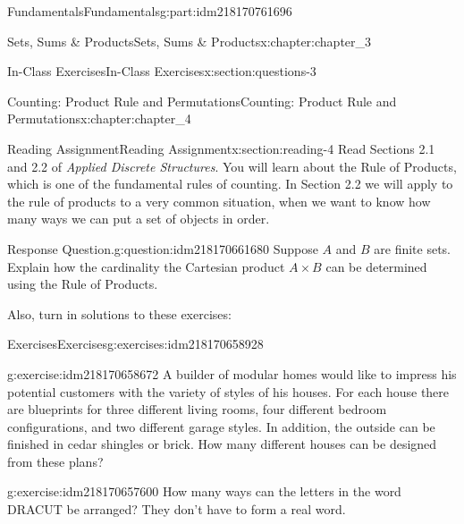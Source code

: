 \documentclass[oneside,10pt,]{book}
\numberwithin{equation}{section}
\begin{document}
\begin{partptx}{Fundamentals}{}{Fundamentals}{}{}{g:part:idm218170761696}
\begin{chapterptx}{Sets, Sums \& Products}{}{Sets, Sums \& Products}{}{}{x:chapter:chapter_3}
\begin{sectionptx}{In-Class Exercises}{}{In-Class Exercises}{}{}{x:section:questions-3}
\begin{enumerate}[label=\arabic*.]
\end{enumerate}
%
\end{sectionptx}
\end{chapterptx}
%
\typeout{************************************************}
\typeout{************************************************}
%
\begin{chapterptx}{Counting: Product Rule and Permutations}{}{Counting: Product Rule and Permutations}{}{}{x:chapter:chapter_4}
\index{}%
%
%
\typeout{************************************************}
\typeout{************************************************}
%
\begin{sectionptx}{Reading Assignment}{}{Reading Assignment}{}{}{x:section:reading-4}
Read Sections 2.1 and 2.2 of \emph{Applied Discrete Structures}.  You will learn about the Rule of Products, which is one of the fundamental rules of counting.  In Section 2.2 we will apply to the rule of products to a very common situation, when we want to know how many ways we can put a set of objects in order.%
\begin{question}{Response Question.}{g:question:idm218170661680}%
Suppose \(A\) and \(B\) are finite sets.  Explain how the cardinality the Cartesian product \(A \times B\) can be determined using the Rule of Products.%
\end{question}
Also, turn in solutions to these exercises:%
%
%
\typeout{************************************************}
\typeout{************************************************}
%
\begin{exercises-subsection-numberless}{Exercises}{}{Exercises}{}{}{g:exercises:idm218170658928}
\par\medskip\noindent%
%
\begin{exercisegroup}
\begin{divisionexerciseeg}{1}{}{}{g:exercise:idm218170658672}%
A builder of modular homes would like to impress his potential customers with the variety of styles of his houses. For each house there are blueprints for three different living rooms, four different bedroom configurations, and two different garage styles. In addition, the outside can be finished in cedar shingles or brick. How many different houses can be designed from these plans?%
\end{divisionexerciseeg}%
\begin{divisionexerciseeg}{2}{}{}{g:exercise:idm218170657600}%
How many ways can the letters in the word DRACUT be arranged? They don't have to form a real word.%

\end{divisionexerciseeg}
\end{exercisegroup}
\end{exercises-subsection-numberless}
\end{sectionptx}
\end{chapterptx}
\end{partptx}
\end{document}
